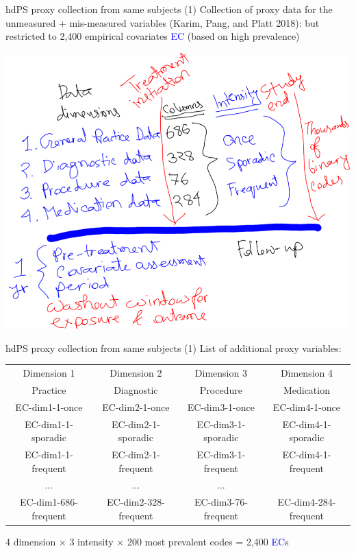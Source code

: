 \documentclass[
  ignorenonframetext,
  aspectratio=169]{beamer}
\begin{document}
\begin{frame}{hdPS proxy collection from same subjects (1)}
\protect\hypertarget{hdps-proxy-collection-from-same-subjects-1-3}{}
Collection of proxy data for the unmeasured + mis-measured variables
(Karim, Pang, and Platt 2018): but restricted to 2,400 empirical
covariates \textcolor{blue}{EC} (based on high prevalence)

\begin{center}
\includegraphics[width=0.45\linewidth]{proxy22.png}
\end{center}
\end{frame}

\begin{frame}{hdPS proxy collection from same subjects (1)}
\protect\hypertarget{hdps-proxy-collection-from-same-subjects-1-4}{}
List of additional proxy variables:

\begin{center}
\begin{tabular}{ c c c c }
 \toprule
Dimension 1 & Dimension 2 & Dimension 3 & Dimension 4\\
Practice  & Diagnostic & Procedure & Medication\\
 \midrule
EC-dim1-1-once & EC-dim2-1-once & EC-dim3-1-once & EC-dim4-1-once\\
EC-dim1-1-sporadic & EC-dim2-1-sporadic & EC-dim3-1-sporadic & EC-dim4-1-sporadic\\
EC-dim1-1-frequent & EC-dim2-1-frequent & EC-dim3-1-frequent & EC-dim4-1-frequent\\
$\ldots$ &  $\ldots$ & $\ldots$ \\
EC-dim1-686-frequent & EC-dim2-328-frequent & EC-dim3-76-frequent & EC-dim4-284-frequent\\
 \bottomrule
\end{tabular}
\end{center}

4 dimension \(\times\) 3 intensity \(\times\) 200 most prevalent codes =
2,400 \textcolor{blue}{EC}s
\end{frame}
\end{document}
